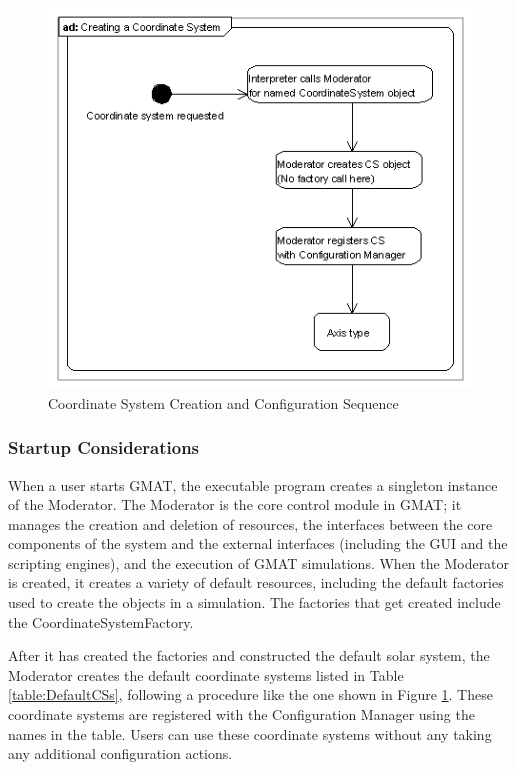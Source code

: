 \begin{figure}
\begin{center}
\includegraphics[223,200]{Images/CSCreationSequence.png}
\caption{\label{figure:CSCreationSequence}Coordinate System Creation and Configuration Sequence}
\end{center}
\end{figure}

\subsubsection{Startup Considerations}

When a user starts GMAT, the executable program creates a singleton instance of the Moderator. The
Moderator is the core control module in GMAT; it manages the creation and deletion of resources, the
interfaces between the core components of the system and the external interfaces (including the GUI
and the scripting engines), and the execution of GMAT simulations. When the Moderator is created, it
creates a variety of default resources, including the default factories used to create the objects
in a simulation. The factories that get created include the CoordinateSystemFactory.

After it has created the factories and constructed the default solar system, the Moderator creates
the default coordinate systems listed in Table \ref{table:DefaultCSs}, following a procedure like
the one shown in Figure \ref{figure:CSCreationSequence}. These coordinate systems are registered
with the Configuration Manager using the names in the table. Users can use these coordinate systems
without any taking any additional configuration actions.

